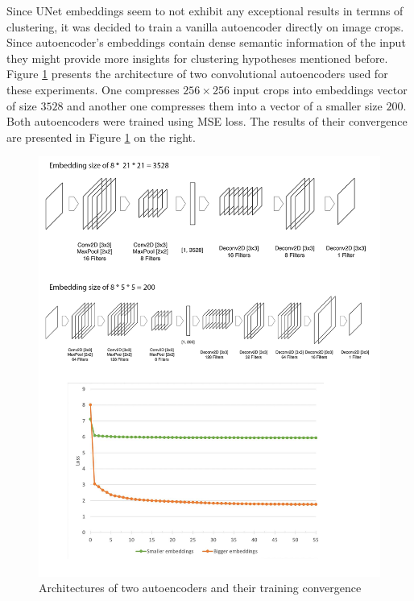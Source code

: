 Since UNet embeddings seem to not exhibit any exceptional results in termns of clustering, it was decided to train a vanilla autoencoder directly on image crops. Since autoencoder's embeddings contain dense semantic information of the input they might provide more insights for clustering hypotheses mentioned before. Figure \ref{fig:ae-training} presents the architecture of two convolutional autoencoders used for these experiments. One compresses $256 \times 256$ input crops into embeddings vector of size $3528$ and another one compresses them into a vector of a smaller size $200$. Both autoencoders were trained using MSE loss. The results of their convergence are presented in Figure \ref{fig:ae-training} on the right.

\begin{figure}[H]
	\begin{center}
		\includegraphics[width=\linewidth]{bilder/ae-embeddings/training-architectures.png}
		\caption{Architectures of two autoencoders and their training convergence}\label{fig:ae-training}
	\end{center}
\end{figure}

